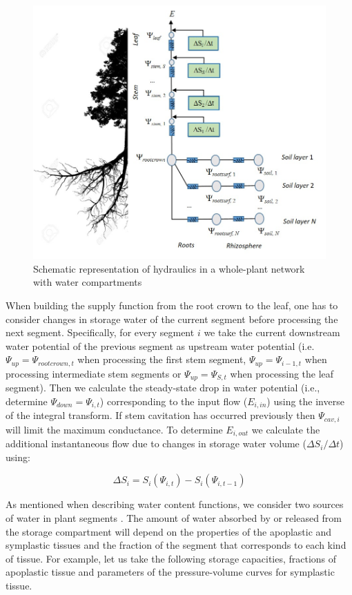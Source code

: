 \documentclass[]{book}
\begin{document}
\begin{figure}

{\centering \includegraphics[width=0.8\linewidth]{hydraulics_full} 

}

\caption{Schematic representation of hydraulics in a whole-plant network with water compartments}\label{fig:unnamed-chunk-45}
\end{figure}

When building the supply function from the root crown to the leaf, one
has to consider changes in storage water of the current segment before
processing the next segment. Specifically, for every segment \(i\) we
take the current downstream water potential of the previous segment as
upstream water potential (i.e. \(\Psi_{up} = \Psi_{rootcrown, t}\) when
processing the first stem segment, \(\Psi_{up} = \Psi_{i-1, t}\) when
processing intermediate stem segments or \(\Psi_{up} = \Psi_{S, t}\)
when processing the leaf segment). Then we calculate the steady-state
drop in water potential (i.e., determine \(\Psi_{down} = \Psi_{i, t}\))
corresponding to the input flow (\(E_{i,in}\)) using the inverse of the
integral transform. If stem cavitation has occurred previously then
\(\Psi_{cav,i}\) will limit the maximum conductance. To determine
\(E_{i,out}\) we calculate the additional instantaneous flow due to
changes in storage water volume (\(\Delta S_{i}/\Delta t\)) using:

\begin{equation}
\Delta S_{i} = S_i(\Psi_{i, t}) - S_i(\Psi_{i, t-1})
\end{equation}

As mentioned when describing water content functions, we consider two
sources of water in plant segments \citep{Tyree1990}. The amount of
water absorbed by or released from the storage compartment will depend
on the properties of the apoplastic and symplastic tissues and the
fraction of the segment that corresponds to each kind of tissue. For
example, let us take the following storage capacities, fractions of
apoplastic tissue and parameters of the pressure-volume curves for
symplastic tissue.
\end{document}
